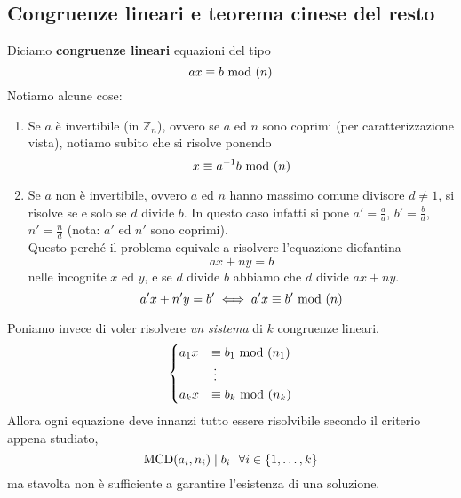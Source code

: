 \subsection{Congruenze lineari e teorema cinese del resto}
Diciamo \textbf{congruenze lineari} equazioni del tipo
\begin{equation*}
ax\equiv b\ \mathrm{mod}\ (n)
\end{equation*}
Notiamo alcune cose:
\begin{enumerate}
	\item Se $a$ è invertibile (in $\mathbb{Z}_n$), ovvero se $a$ ed $n$ sono coprimi (per caratterizzazione vista), notiamo subito che si risolve ponendo
	\begin{equation*}
	x\equiv a^{-1}b\ \mathrm{mod}\ (n)
	\end{equation*}
	\item Se $a$ non è invertibile, ovvero $a$ ed $n$ hanno massimo comune divisore $d\neq1$, si risolve se e solo se $d$ divide $b$. In questo caso infatti si pone $a'=\frac{a}{d}$, $b'=\frac{b}{d}$, $n'=\frac{n}{d}$ (nota: $a'$ ed $n'$ sono coprimi).\\
	Questo perché il problema equivale a risolvere l'equazione diofantina 
	\begin{equation*}
	ax+ny=b
	\end{equation*}
	nelle incognite $x$ ed $y$, e se $d$ divide $b$ abbiamo che $d$ divide $ax+ny$.
	\begin{equation*}
	a'x+n'y=b' \iff a'x\equiv b'\ \mathrm{mod}\ (n)
	\end{equation*}
\end{enumerate}
Poniamo invece di voler risolvere \textit{un sistema} di $k$ congruenze lineari.
\begin{equation*}
\begin{cases}
a_1x&\equiv b_1\ \mathrm{mod}\ (n_1)\\
&\,\vdots\\
a_kx&\equiv b_k\ \mathrm{mod}\ (n_k)
\end{cases}
\end{equation*}
Allora ogni equazione deve innanzi tutto essere risolvibile secondo il criterio appena studiato, 
\begin{equation*}
\operatorname{\mathrm{MCD}}(a_i,n_i)\mid b_i \ \ \forall i \in \left\{1, \dots, k\right\}
\end{equation*}
ma stavolta non è sufficiente a garantire l'esistenza di una soluzione.
